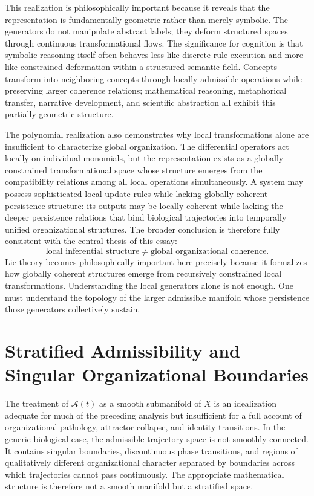 \documentclass[12pt,a4paper]{report}
\theoremstyle{flyxion}
\begin{document}
This realization is philosophically important because it reveals that the representation is fundamentally geometric rather than merely symbolic. The generators do not manipulate abstract labels; they deform structured spaces through continuous transformational flows. The significance for cognition is that symbolic reasoning itself often behaves less like discrete rule execution and more like constrained deformation within a structured semantic field. Concepts transform into neighboring concepts through locally admissible operations while preserving larger coherence relations; mathematical reasoning, metaphorical transfer, narrative development, and scientific abstraction all exhibit this partially geometric structure.

The polynomial realization also demonstrates why local transformations alone are insufficient to characterize global organization. The differential operators act locally on individual monomials, but the representation exists as a globally constrained transformational space whose structure emerges from the compatibility relations among all local operations simultaneously. A system may possess sophisticated local update rules while lacking globally coherent persistence structure: its outputs may be locally coherent while lacking the deeper persistence relations that bind biological trajectories into temporally unified organizational structures. The broader conclusion is therefore fully consistent with the central thesis of this essay:
\[
\text{local inferential structure} \neq \text{global organizational coherence}.
\]
Lie theory becomes philosophically important here precisely because it formalizes how globally coherent structures emerge from recursively constrained local transformations. Understanding the local generators alone is not enough. One must understand the topology of the larger admissible manifold whose persistence those generators collectively sustain.

\section{Stratified Admissibility and Singular Organizational Boundaries}

The treatment of $\mathcal{A}(t)$ as a smooth submanifold of $X$ is an idealization adequate for much of the preceding analysis but insufficient for a full account of organizational pathology, attractor collapse, and identity transitions. In the generic biological case, the admissible trajectory space is not smoothly connected. It contains singular boundaries, discontinuous phase transitions, and regions of qualitatively different organizational character separated by boundaries across which trajectories cannot pass continuously. The appropriate mathematical structure is therefore not a smooth manifold but a stratified space.
\end{document}
